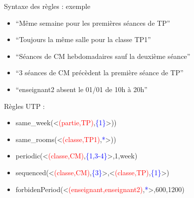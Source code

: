 \documentclass{beamer}
\begin{document}
\begin{frame}{Syntaxe des règles : exemple}

 \begin{itemize}
     \item ``Même semaine pour les premières séances de TP''
     \item ``Toujours la même salle pour la classe TP1''
     \item ``Séances de CM hebdomadaires sauf la deuxième séance''
     \item ``3 séances de CM précèdent la première séance de TP''
     \item ``enseignant2 absent le 01/01 de 10h à 20h''
 \end{itemize}
 \vspace{0.7cm}
    Règles UTP :
        \begin{itemize}
        \item same\_week(<\textcolor{red}{(partie,TP)},\textcolor{blue}{\{1\}}>))
        \item same\_rooms(<\textcolor{red}{(classe,TP1)},\textcolor{blue}{*}>))

        \item periodic(<\textcolor{red}{(classe,CM)},\textcolor{blue}{\{1,3-4\}}>,1,week)

        \item sequenced(<\textcolor{red}{(classe,CM)},\textcolor{blue}{\{3\}}>,<\textcolor{red}{(classe,TP)},\textcolor{blue}{\{1\}}>)

        \item forbidenPeriod(<\textcolor{red}{(enseignant,enseignant2)},\textcolor{blue}{*}>,600,1200)
    \end{itemize}
\end{frame}

%
\end{document}
